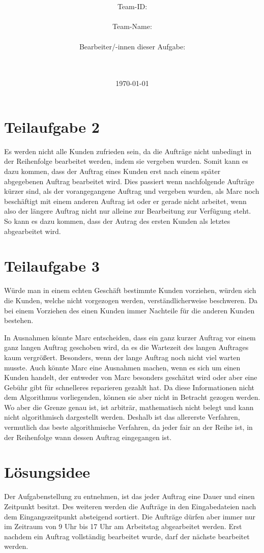 \documentclass[a4paper,10pt,ngerman]{scrartcl}
\title{\textbf{\Huge\Aufgabe}}
\author{\LARGE Team-ID: \LARGE \TeamId \\\\
\LARGE Team-Name: \LARGE \TeamName \\\\
\LARGE Bearbeiter/-innen dieser Aufgabe: \\
\LARGE \Namen\\\\}
\date{\LARGE\today}
\begin{document}
\maketitle
\tableofcontents

\vspace{0.5cm}

\section{Teilaufgabe 2}\label{sec:begruendung2}
Es werden nicht alle Kunden zufrieden sein,
da die Aufträge nicht unbedingt in der Reihenfolge bearbeitet werden,
indem sie vergeben wurden.
Somit kann es dazu kommen, dass der Auftrag eines Kunden
erst nach einem später abgegebenen Auftrag bearbeitet wird.
Dies passiert wenn nachfolgende Aufträge kürzer sind,
als der vorangegangene Auftrag und vergeben wurden,
als Marc noch beschäftigt mit einem anderen Auftrag ist oder er gerade nicht arbeitet,
wenn also der längere Auftrag nicht nur alleine zur Bearbeitung zur Verfügung steht.
So kann es dazu kommen, dass der Autrag des ersten Kunden als letztes abgearbeitet wird.

\section{Teilaufgabe 3}\label{sec:begruendung3 }
Würde man in einem echten Geschäft bestimmte Kunden vorziehen,
würden sich die Kunden, welche nicht vorgezogen werden, verständlicherweise beschweren.
Da bei einem Vorziehen des einen Kunden immer Nachteile für die anderen Kunden bestehen.

In Ausnahmen könnte Marc entscheiden, dass ein ganz kurzer Auftrag vor einem ganz langen Auftrag geschoben wird,
da es die Wartezeit des langen Auftrages kaum vergrößert.
Besonders, wenn der lange Auftrag noch nicht viel warten musste.
Auch könnte Marc eine Ausnahmen machen, wenn es sich um einen Kunden handelt,
der entweder von Marc besonders geschätzt wird
oder aber eine Gebühr gibt für schnelleres reparieren gezahlt hat.
Da diese Informationen nicht dem Algorithmus vorliegenden,
können sie aber nicht in Betracht gezogen werden.
Wo aber die Grenze genau ist, ist arbiträr, mathematisch nicht belegt
und kann nicht algorithmisch dargestellt werden.
Deshalb ist das allererste Verfahren, vermutlich das beste algorithmische Verfahren,
da jeder fair an der Reihe ist,
in der Reihenfolge wann dessen Auftrag eingegangen ist.

\section{Lösungsidee}\label{sec:losungsidee}
Der Aufgabenstellung zu entnehmen,
ist das jeder Auftrag eine Dauer und einen Zeitpunkt besitzt.
Des weiteren werden die Aufträge in den Eingabedateien
nach dem Eingangszeitpunkt absteigend sortiert.
Die Aufträge dürfen aber immer nur im Zeitraum von 9 Uhr bis 17 Uhr
am Arbeitstag abgearbeitet werden.
Erst nachdem ein Auftrag vollständig bearbeitet wurde,
darf der nächste bearbeitet werden.
\end{document}
